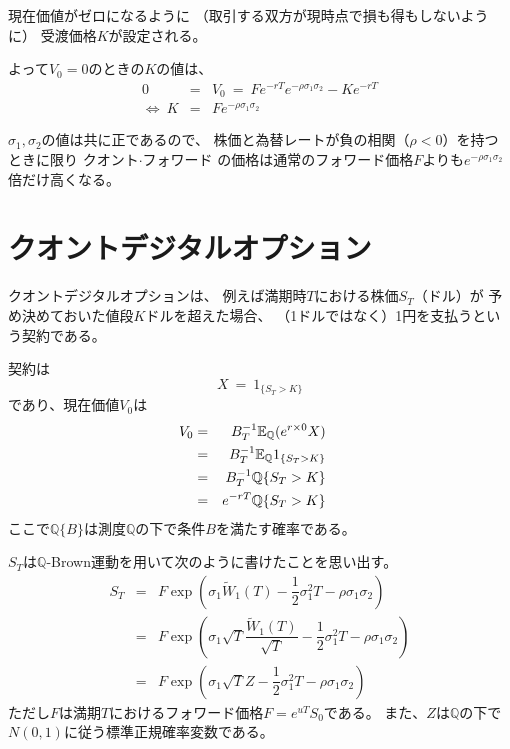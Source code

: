 \documentclass[uplatex,a4j,12pt,dvipdfmx]{jsarticle}
\begin{document}
現在価値がゼロになるように
（取引する双方が現時点で損も得もしないように）
受渡価格$K$が設定される。

よって$V_{0}=0$のときの$K$の値は、
%
%
\begin{eqnarray*}
	0 &=& V_{0}
	\ = \
	F
	e^{-rT}
	e^{- \rho \sigma_{1} \sigma_{2}}
	-
	Ke^{-rT}
	\\
	\Longleftrightarrow
	\
	K
	&=&
	F
	e^{- \rho \sigma_{1} \sigma_{2}}
\end{eqnarray*}
%
%

$\sigma_{1},\sigma_{2}$の値は共に正であるので、
株価と為替レートが負の相関（$\rho < 0$）を持つときに限り
クオント$\cdot$フォワード
の価格は通常のフォワード価格$F$よりも$e^{- \rho \sigma_{1} \sigma_{2}}$倍だけ高くなる。


\section{クオントデジタルオプション}

クオントデジタルオプションは、
例えば満期時$T$における株価$S_{T}$（ドル）が
予め決めておいた値段$K$ドルを超えた場合、
（1ドルではなく）1円を支払うという契約である。

契約は
$$
	X
	\ = \
	1_{ \{ S_{T}>K \} }
$$
であり、現在価値$V_{0}$は
%
%
\begin{eqnarray*}
	\hspace{-10mm}
	V_{0}
	& = &
	B^{-1}_{T}
	\mathbb{E}_{\mathbb{Q}}
	( e^{r \times 0} X )
	\\ & = &
	B^{-1}_{T}
	\mathbb{E}_{\mathbb{Q}}
	1_{ \{ S_{T}>K \} }
	\\ & = &
	B^{-1}_{T}
	\mathbb{Q}
	\{ S_{T}>K \}
	\\ & = &
	e^{-rT}
	\mathbb{Q}
	\{ S_{T}>K \}
\end{eqnarray*}
%
%
ここで$\mathbb{Q}\{B\}$は測度$\mathbb{Q}$の下で条件$B$を満たす確率である。

$S_{T}$は$\mathbb{Q}$-Brown運動を用いて次のように書けたことを思い出す。
%
%
\begin{eqnarray*}
	S_{T}
	&=&
	F
	\exp \left( \sigma_{1} \tilde{W}_{1}(T) -
	\dfrac{1}{2} \sigma_{1}^{2} T -
	\rho \sigma_{1} \sigma_{2}
	\right)
	\\ &=&
	F
	\exp \left( \sigma_{1} \sqrt{T} \dfrac{ \tilde{W}_{1}(T) }{ \sqrt{T} } -
	\dfrac{1}{2} \sigma_{1}^{2} T -
	\rho \sigma_{1} \sigma_{2} \right)
	\\ &=&
	F
	\exp \left( \sigma_{1} \sqrt{T} Z -
	\dfrac{1}{2} \sigma_{1}^{2} T  -
	\rho \sigma_{1} \sigma_{2}\right)
\end{eqnarray*}
%
%
ただし$F$は満期$T$におけるフォワード価格$F = e^{uT} S_{0}$である。
また、$Z$は$\mathbb{Q}$の下で$N(0,1)$に従う標準正規確率変数である。
\end{document}
